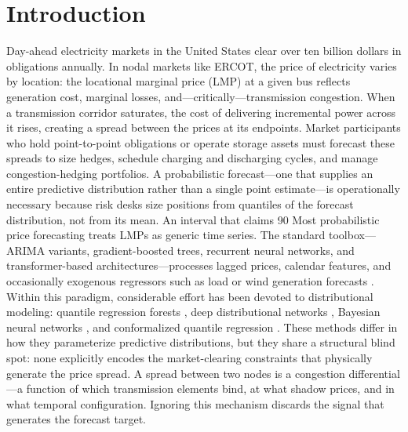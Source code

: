 \section{Introduction}
Day-ahead electricity markets in the United States clear over ten billion dollars in obligations annually. In nodal markets like ERCOT, the price of electricity varies by location: the locational marginal price (LMP) at a given bus reflects generation cost, marginal losses, and---critically---transmission congestion. When a transmission corridor saturates, the cost of delivering incremental power across it rises, creating a spread between the prices at its endpoints. Market participants who hold point-to-point obligations or operate storage assets must forecast these spreads to size hedges, schedule charging and discharging cycles, and manage congestion-hedging portfolios. A probabilistic forecast---one that supplies an entire predictive distribution rather than a single point estimate---is operationally necessary because risk desks size positions from quantiles of the forecast distribution, not from its mean. An interval that claims 90%
Most probabilistic price forecasting treats LMPs as generic time series. The standard toolbox---ARIMA variants, gradient-boosted trees, recurrent neural networks, and transformer-based architectures---processes lagged prices, calendar features, and occasionally exogenous regressors such as load or wind generation forecasts \cite{lago2020forecasting, hong2020energy}. Within this paradigm, considerable effort has been devoted to distributional modeling: quantile regression forests \cite{taieb2016forecasting}, deep distributional networks \cite{toubeau2018deep}, Bayesian neural networks \cite{brusaferri2019bayesian}, and conformalized quantile regression \cite{jonkers2024novel}. These methods differ in how they parameterize predictive distributions, but they share a structural blind spot: none explicitly encodes the market-clearing constraints that physically generate the price spread. A spread between two nodes is a congestion differential---a function of which transmission elements bind, at what shadow prices, and in what temporal configuration. Ignoring this mechanism discards the signal that generates the forecast target.
